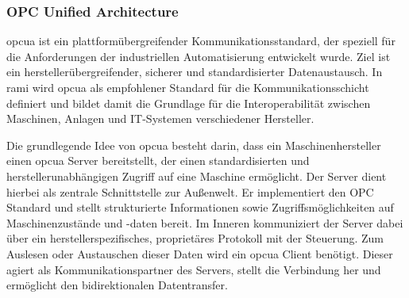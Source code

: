 \subsubsection{OPC Unified Architecture}
\acs{opcua} ist ein plattformübergreifender Kommunikationsstandard, der speziell für die Anforderungen der industriellen Automatisierung entwickelt wurde.
Ziel ist ein herstellerübergreifender, sicherer und standardisierter Datenaustausch.
In \acs{rami} \cite{RAMI4.0} wird \acs{opcua} als empfohlener Standard für die Kommunikationsschicht definiert und bildet damit die Grundlage für die Interoperabilität zwischen Maschinen, Anlagen und IT-Systemen verschiedener Hersteller.

Die grundlegende Idee von \acs{opcua} besteht darin, dass ein Maschinenhersteller einen \acs{opcua} Server bereitstellt, der einen standardisierten und herstellerunabhängigen Zugriff auf eine Maschine ermöglicht.
Der Server dient hierbei als zentrale Schnittstelle zur Außenwelt. Er implementiert den OPC Standard und stellt strukturierte Informationen sowie Zugriffsmöglichkeiten auf Maschinenzustände und -daten bereit.
Im Inneren kommuniziert der Server dabei über ein herstellerspezifisches, proprietäres Protokoll mit der Steuerung.
Zum Auslesen oder Austauschen dieser Daten wird ein \acs{opcua} Client benötigt. Dieser agiert als Kommunikationspartner des Servers, stellt die Verbindung her und ermöglicht den bidirektionalen Datentransfer. \cite{OPCUA}